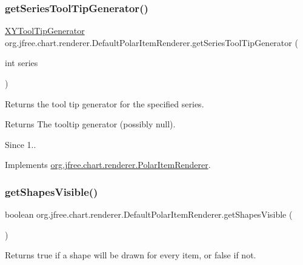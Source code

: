 \subsubsection{\texorpdfstring{get\+Series\+Tool\+Tip\+Generator()}{getSeriesToolTipGenerator()}}
{\footnotesize\ttfamily \mbox{\hyperlink{interfaceorg_1_1jfree_1_1chart_1_1labels_1_1_x_y_tool_tip_generator}{X\+Y\+Tool\+Tip\+Generator}} org.\+jfree.\+chart.\+renderer.\+Default\+Polar\+Item\+Renderer.\+get\+Series\+Tool\+Tip\+Generator (\begin{DoxyParamCaption}\item[{int}]{series }\end{DoxyParamCaption})}

Returns the tool tip generator for the specified series.

\begin{DoxyReturn}{Returns}
The tooltip generator (possibly {\ttfamily null}).
\end{DoxyReturn}
\begin{DoxySince}{Since}
1.. 
\end{DoxySince}


Implements \mbox{\hyperlink{interfaceorg_1_1jfree_1_1chart_1_1renderer_1_1_polar_item_renderer_a88c82899310074e147185e59d46060b2}{org.\+jfree.\+chart.\+renderer.\+Polar\+Item\+Renderer}}.

\mbox{\label{classorg_1_1jfree_1_1chart_1_1renderer_1_1_default_polar_item_renderer_ab3780c76ab7cbe0f2b4a1616c24a1a60}} 
\subsubsection{\texorpdfstring{get\+Shapes\+Visible()}{getShapesVisible()}}
{\footnotesize\ttfamily boolean org.\+jfree.\+chart.\+renderer.\+Default\+Polar\+Item\+Renderer.\+get\+Shapes\+Visible (\begin{DoxyParamCaption}{ }\end{DoxyParamCaption})}

Returns {\ttfamily true} if a shape will be drawn for every item, or {\ttfamily false} if not.


